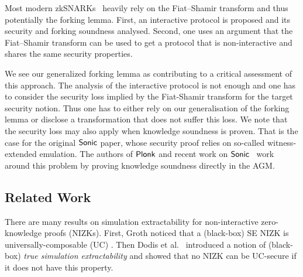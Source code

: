 Most modern zkSNARKs~\cite{SP:BBBPWM18,CCS:MBKM19} heavily
rely on the Fiat--Shamir transform and thus potentially the forking lemma. First, an interactive
protocol is proposed and its security and forking soundness analysed. Second,
one uses an argument that the Fiat--Shamir transform can be used to get a
protocol that is non-interactive and shares the same security properties.

We see our generalized forking lemma as contributing to a critical assessment of
this approach. The analysis of the interactive protocol is not enough and one
has to consider the security loss implied by the Fiat-Shamir transform for the target security notion. Thus one has to either rely on our generalisation of the forking
lemma or disclose a transformation that does not suffer this loss. We note that
the security loss may also apply when knowledge soundness is proven. That is the
case for the original ${\textnormal{\textsf{Sonic}}}$ paper, whose security proof relies on so-called witness-extended
emulation. The authors of $\textnormal{\textsf{Plonk}}$ and recent work on ${\textnormal{\textsf{Sonic}}}$~\cite{cryptoeprint:2020:1351} work around this problem by proving
knowledge soundness directly in the AGM.



\subsection{Related Work}
%
%

There are many results on simulation extractability for
non-interactive zero-knowledge proofs (NIZKs). First, Groth \cite{AC:Groth07}
noticed that a (black-box) SE NIZK is
universally-composable (UC) 
\cite{EPRINT:Canetti00}. Then Dodis et al.~\cite{AC:DHLW10} introduced a
notion of (black-box) \emph{true simulation extractability} and showed that no
NIZK can be UC-secure if it does not have this property. 


